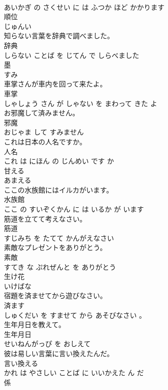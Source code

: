 \documentclass[8pt]{extreport}
\begin{document}
\begin{CJK}{UTF8}{min}
\\	あいかぎ の さくせい に は ふつか ほど かかります			
\\	順位	
\\	じゅんい			
\\	知らない言葉を辞典で調べました。	
\\	辞典 
\\	しらない ことば を じてん で しらべました			
\\	墨	
\\	すみ			
\\	車掌さんが車内を回って来たよ。	
\\	車掌 
\\	しゃしょう さん が しゃない を まわって きた よ			
\\	お邪魔して済みません。	
\\	邪魔 
\\	おじゃま して すみません			
\\	これは日本の人名ですか。	
\\	人名 
\\	これ は にほん の じんめい です か			
\\	甘える	
\\	あまえる			
\\	ここの水族館にはイルカがいます。	
\\	水族館 
\\	ここ の すいぞくかん に は いるか が います			
\\	筋道を立てて考えなさい。	
\\	筋道 
\\	すじみち を たてて かんがえなさい			
\\	素敵なプレゼントをありがとう。	
\\	素敵 
\\	すてき な ぷれぜんと を ありがとう			
\\	生け花	
\\	いけばな			
\\	宿題を済ませてから遊びなさい。	
\\	済ます 
\\	しゅくだい を すませて から あそびなさい 。			
\\	生年月日を教えて。	
\\	生年月日 
\\	せいねんがっぴ を おしえて			
\\	彼は易しい言葉に言い換えたんだ。	
\\	言い換える 
\\	かれ は やさしい ことば に いいかえた ん だ			
\\	係	

\end{CJK}
\end{document}
